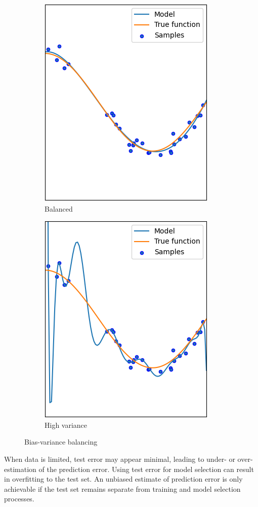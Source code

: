 \begin{figure}[H]
\begin{subfigure}{0.32\textwidth}
        \includegraphics[width=0.75\linewidth]{images/b.png} 
        \caption{Balanced}
    \end{subfigure}
    \begin{subfigure}{0.32\textwidth}
        \centering
        \includegraphics[width=0.75\linewidth]{images/hv.png} 
        \caption{High variance}
    \end{subfigure}
    \caption{Bias-variance balancing}
\end{figure}
When data is limited, test error may appear minimal, leading to under- or over-estimation of the prediction error. 
Using test error for model selection can result in overfitting to the test set. 
An unbiased estimate of prediction error is only achievable if the test set remains separate from training and model selection processes.